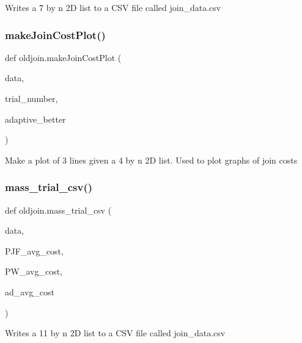 \begin{DoxyVerb}Writes a 7 by n 2D list to a CSV file called join_data.csv \end{DoxyVerb}
 \mbox{\label{namespaceoldjoin_acd67830af4aecf91efa9c32ba4ad060a}} 
\subsubsection{\texorpdfstring{make\+Join\+Cost\+Plot()}{makeJoinCostPlot()}}
{\footnotesize\ttfamily def oldjoin.\+make\+Join\+Cost\+Plot (\begin{DoxyParamCaption}\item[{}]{data,  }\item[{}]{trial\+\_\+number,  }\item[{}]{adaptive\+\_\+better }\end{DoxyParamCaption})}

\begin{DoxyVerb}Make a plot of 3 lines given a 4 by n 2D list. Used to plot graphs of join costs \end{DoxyVerb}
 \mbox{\label{namespaceoldjoin_a3c1f060ef4b4343cdc4231fbccfeadb9}} 
\subsubsection{\texorpdfstring{mass\+\_\+trial\+\_\+csv()}{mass\_trial\_csv()}}
{\footnotesize\ttfamily def oldjoin.\+mass\+\_\+trial\+\_\+csv (\begin{DoxyParamCaption}\item[{}]{data,  }\item[{}]{P\+J\+F\+\_\+avg\+\_\+cost,  }\item[{}]{P\+W\+\_\+avg\+\_\+cost,  }\item[{}]{ad\+\_\+avg\+\_\+cost }\end{DoxyParamCaption})}

\begin{DoxyVerb}Writes a 11 by n 2D list to a CSV file called join_data.csv \end{DoxyVerb}
 \mbox{\label{namespaceoldjoin_a7df1afa3b1e7e79e86d2db42e625ec70}} 
